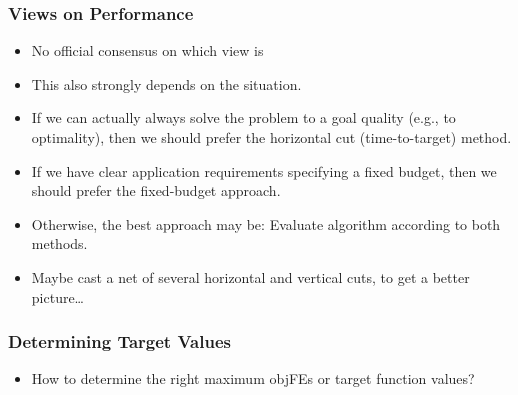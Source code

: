 \documentclass[aspectratio=169,mathserif,notheorems]{beamer}%
\begin{document}
%
\begin{frame}%
\frametitle{Views on Performance}%
\begin{itemize}%
\item No official consensus on which view is %
\item<2-> This also strongly depends on the situation.%
\item<3-> If we can actually always solve the problem to a  goal quality (e.g., to optimality), then we should prefer the horizontal cut (time-to-target) method.%
\item<4-> If we have clear application requirements specifying a fixed budget, then we should prefer the fixed-budget approach.%
\item<5-> Otherwise, the best approach may be: Evaluate algorithm according to both methods.\cite{WCLTTCMY2014BOAAOSFFTTSP,WNT2010AAOAB,WWQLT2018ADCOAAPIBAWATCFEDASAIF}%
\item<6-> Maybe cast a net of several horizontal and vertical cuts, to get a better picture\dots%
\end{itemize}%
\end{frame}%
%
\begin{frame}%
\frametitle{Determining Target Values}%
\begin{itemize}%
\item How to determine the right maximum \glspl{objFE} or target function values?%
\end{itemize}%
\end{frame}%
%
\end{document}

